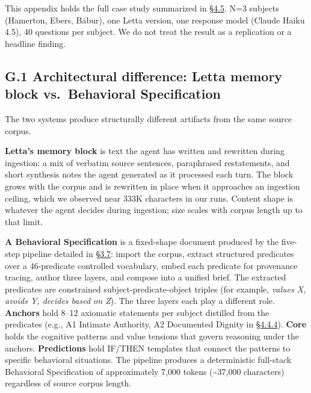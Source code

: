 This appendix holds the full case study summarized in \hyperref[exploratory-case-study-letta-stateful-agent-n3-post-hoc]{§4.5}. N=3 subjects
(Hamerton, Ebers, Bābur), one Letta version, one response model (Claude
Haiku 4.5), 40 questions per subject. We do not treat the result as a
replication or a headline finding.

\hypertarget{g.1-architectural-difference-letta-memory-block-vs.-behavioral-specification}{%
\subsection{G.1 Architectural difference: Letta memory block
vs.~Behavioral
Specification}\label{g.1-architectural-difference-letta-memory-block-vs.-behavioral-specification}}

The two systems produce structurally different artifacts from the same
source corpus.

\textbf{Letta's memory block} is text the agent has written and
rewritten during ingestion: a mix of verbatim source sentences,
paraphrased restatements, and short synthesis notes the agent generated
as it processed each turn. The block grows with the corpus and is
rewritten in place when it approaches an ingestion ceiling, which we
observed near 333K characters in our runs. Content shape is whatever the agent
decides during ingestion; size scales with corpus length up to that
limit.

\textbf{A Behavioral Specification} is a fixed-shape document produced
by the five-step pipeline detailed in \hyperref[pipeline-for-the-behavioral-specification]{§3.7}: import the corpus, extract
structured predicates over a 46-predicate controlled vocabulary, embed
each predicate for provenance tracing, author three layers, and compose
into a unified brief. The extracted predicates are constrained
subject-predicate-object triples (for example, \emph{values X, avoids Y,
decides based on Z}). The three layers each play a different role.
\textbf{Anchors} hold 8--12 axiomatic statements per subject distilled
from the predicates (e.g., A1 Intimate Authority, A2 Documented Dignity
in \hyperref[case-study-cross-system-refusal-on-keckley-q21]{§4.4.4}). \textbf{Core} holds the cognitive patterns and value
tensions that govern reasoning under the anchors. \textbf{Predictions}
hold IF/THEN templates that connect the patterns to specific behavioral
situations. The pipeline produces a deterministic full-stack Behavioral
Specification of approximately 7,000 tokens (\textasciitilde37,000
characters) regardless of source corpus length.

